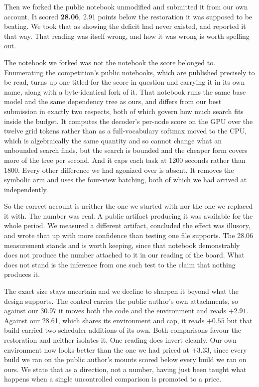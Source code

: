 \documentclass[11pt]{article}
\begin{document}
Then we forked the public notebook unmodified and submitted it from our own account. It scored
\textbf{28.06}, 2.91 points
below the restoration it was supposed to be beating. We took that as showing the deficit had never
existed, and reported it that way. That reading was itself wrong, and how it was wrong is worth
spelling out.

The notebook we forked was not the notebook the score belonged to. Enumerating the competition's public
notebooks, which are published precisely to be read, turns up one titled for the score in question and
carrying it in its own name, along with a byte-identical fork of it. That notebook runs the same base
model and the same dependency tree as ours, and differs from our best submission in exactly two
respects, both of which govern how much search fits inside the budget. It computes the decoder's
per-node score on the GPU over the twelve grid tokens rather than as a full-vocabulary softmax moved to
the CPU, which is algebraically the same quantity and so cannot change what an unbounded search finds,
but the search is bounded and the cheaper form covers more of the tree per second. And it caps each task
at 1200 seconds rather than 1800. Every other difference we had agonized over is absent. It removes the
symbolic arm and uses the four-view batching, both of which we had arrived at independently.

So the correct account is neither the one we started with nor the one we replaced it with. The number
was real. A public artifact producing it was available for the whole period. We measured a different
artifact, concluded the effect was illusory, and wrote that up with more confidence than testing one
file supports. The 28.06 measurement stands and is worth keeping, since that notebook demonstrably does
not produce the number attached to it in our reading of the board. What does not stand is the inference
from one such test to the claim that nothing produces it.

The exact size stays uncertain and we decline to sharpen it beyond what the design supports. The control
carries the public author's own attachments, so against our 30.97 it moves both the code and the
environment and reads $+2.91$. Against our 28.61, which shares its environment and cap, it reads $+0.55$
but that build carried two scheduler additions of its own. Both comparisons favour the restoration and
neither isolates it. One reading does invert cleanly. Our own environment now looks better than the one
we had priced at $+3.33$, since every build we ran on the public author's mounts scored below every build
we ran on ours. We state that as a direction, not a number, having just been taught what happens when a
single uncontrolled comparison is promoted to a price.
\end{document}
